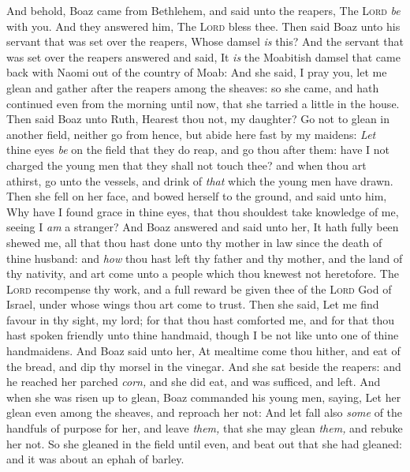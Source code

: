 \documentclass[11pt,letterpaper,oneside]{memoir}
\begin{document}
And behold, Boaz came from Bethlehem, and said unto the reapers, The 
\textsc{Lord} \emph{be} with you. And they answered him, The 
\textsc{Lord} bless thee. Then said Boaz unto his servant that was set 
over the reapers, Whose damsel \emph{is} this? And the servant that was 
set over the reapers answered and said, It \emph{is} the Moabitish 
damsel that came back with Naomi out of the country of Moab: And she 
said, I pray you, let me glean and gather after the reapers among the 
sheaves: so she came, and hath continued even from the morning until 
now, that she tarried a little in the house. Then said Boaz unto Ruth, 
Hearest thou not, my daughter? Go not to glean in another field, neither 
go from hence, but abide here fast by my maidens: \emph{Let} thine eyes 
\emph{be} on the field that they do reap, and go thou after them: have I 
not charged the young men that they shall not touch thee? and when thou 
art athirst, go unto the vessels, and drink of \emph{that} which the 
young men have drawn. Then she fell on her face, and bowed herself to 
the ground, and said unto him, Why have I found grace in thine eyes, 
that thou shouldest take knowledge of me, seeing I \emph{am} a stranger? 
And Boaz answered and said unto her, It hath fully been shewed me, all 
that thou hast done unto thy mother in law since the death of thine 
husband: and \emph{how} thou hast left thy father and thy mother, and 
the land of thy nativity, and art come unto a people which thou knewest 
not heretofore. The \textsc{Lord} recompense thy work, and a full reward 
be given thee of the \textsc{Lord} God of Israel, under whose wings thou 
art come to trust. Then she said, Let me find favour in thy sight, my 
lord; for that thou hast comforted me, and for that thou hast spoken 
friendly unto thine handmaid, though I be not like unto one of thine 
handmaidens. And Boaz said unto her, At mealtime come thou hither, and 
eat of the bread, and dip thy morsel in the vinegar. And she sat beside 
the reapers: and he reached her parched \emph{corn,} and she did eat, 
and was sufficed, and left. And when she was risen up to glean, Boaz 
commanded his young men, saying, Let her glean even among the sheaves, 
and reproach her not: And let fall also \emph{some} of the handfuls of 
purpose for her, and leave \emph{them,} that she may glean \emph{them,} 
and rebuke her not. So she gleaned in the field until even, and beat out 
that she had gleaned: and it was about an ephah of barley. 
\end{document}
